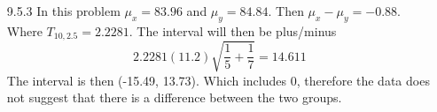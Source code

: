 \documentclass[11pt,fleqn]{article}
\begin{document}
\begin{enumerate}
  \item[9.5.3]
  In this problem $\mu_x = 83.96$ and $\mu_y = 84.84$. Then $\mu_x - \mu_y =
  -0.88$. Where $T_{10,2.5} = 2.2281$. The interval will then be plus/minus 
  \[
  2.2281(11.2)\sqrt{\frac{1}{5} + \frac{1}{7}} = 14.611
  \]
  The interval is then (-15.49, 13.73). Which includes 0, therefore the data
  does not suggest that there is a difference between the two groups. 
\end{enumerate}
\end{document}
